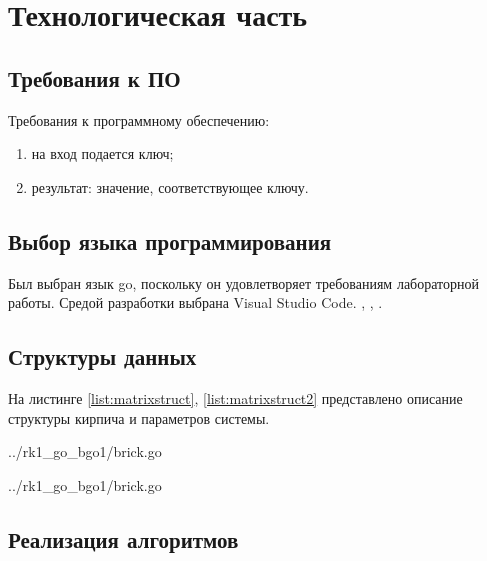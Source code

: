 
\chapter{Технологическая часть}\label{tecnology}

\section{Требования к ПО}\label{Requirements}

Требования к программному обеспечению:
\begin{enumerate}
    \item на вход подается ключ;
    \item результат: значение, соответствующее ключу. 
\end{enumerate}

\section{Выбор языка программирования}\label{Language}

Был выбран язык go, поскольку он удовлетворяет требованиям лабораторной работы. Средой разработки выбрана Visual Studio Code. 
\cite{go}, \cite{linux}, \cite{debian}.

\section{Структуры данных}\label{StructsList}

На листинге \ref{list:matrixstruct}, \ref{list:matrixstruct2} представлено описание структуры кирпича и параметров системы.

\begin{lstinputlisting}
    [caption = {Структура кирпича},
    label = {list:matrixstruct},
    linerange={69-73},
    ]{../rk1_go_bgo1/brick.go}
\end{lstinputlisting}

\newpage

\begin{lstinputlisting}
    [caption = {Параметры системы},
    label = {list:matrixstruct2},
    linerange={40-58},
    ]{../rk1_go_bgo1/brick.go}
\end{lstinputlisting}

\section{Реализация алгоритмов}\label{Listings}

